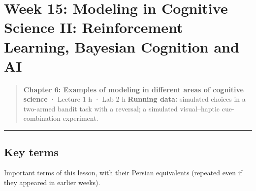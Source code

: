 \section{Week 15: Modeling in Cognitive Science II: Reinforcement
Learning, Bayesian Cognition and AI}

\begin{quote}
\textbf{Chapter 6: Examples of modeling in different areas of cognitive
science} · Lecture 1 h · Lab 2 h \textbf{Running data:} simulated
choices in a two-armed bandit task with a reversal; a simulated
visual--haptic cue-combination experiment.
\end{quote}

\begin{center}\rule{0.5\linewidth}{0.5pt}\end{center}

\subsection{Key terms}

Important terms of this lesson, with their Persian equivalents (repeated
even if they appeared in earlier weeks).

